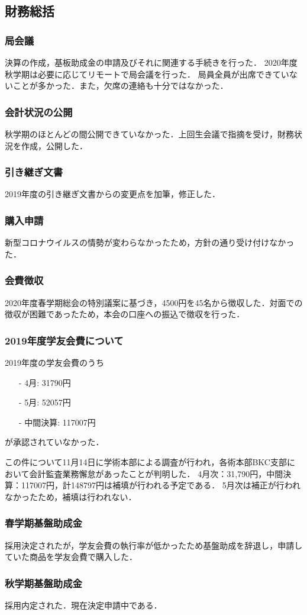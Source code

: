 \subsection*{財務総括}


\subsubsection*{局会議}
決算の作成，基板助成金の申請及びそれに関連する手続きを行った．
2020年度秋学期は必要に応じてリモートで局会議を行った．
局員全員が出席できていないことが多かった．また，欠席の連絡も十分ではなかった．


\subsubsection*{会計状況の公開}
秋学期のほとんどの間公開できていなかった．上回生会議で指摘を受け，財務状況を作成，公開した．


\subsubsection*{引き継ぎ文書}
2019年度の引き継ぎ文書からの変更点を加筆，修正した．


\subsubsection*{購入申請}
新型コロナウイルスの情勢が変わらなかったため，方針の通り受け付けなかった．


\subsubsection*{会費徴収}
2020年度春学期総会の特別議案に基づき，4500円を45名から徴収した．対面での徴収が困難であったため，本会の口座への振込で徴収を行った．


\subsubsection*{2019年度学友会費について}
2019年度の学友会費のうち
\begin{itemize}
	\item[-] 4月: 31790円
	\item[-] 5月: 52057円
	\item[-] 中間決算: 117007円
\end{itemize} 
が承認されていなかった．

この件について11月14日に学術本部による調査が行われ，各術本部BKC支部において会計監査業務懈怠があったことが判明した．
4月次：31,790円，中間決算：117007円，計148797円は補填が行われる予定である．
5月次は補正が行われなかったため，補填は行われない．


\subsubsection*{春学期基盤助成金}
採用決定されたが，学友会費の執行率が低かったため基盤助成を辞退し，申請していた商品を学友会費で購入した．


\subsubsection*{秋学期基盤助成金}
採用内定された．現在決定申請中である．
